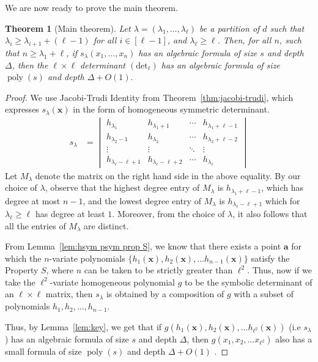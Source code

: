 \documentclass[10pt,a4paper]{article}
\newtheorem{theorem}{Theorem}
\theoremstyle{definition}
\newcommand{\va}{\mathbf a}
\newcommand{\vx}{\mathbf x}
\DeclareMathOperator{\poly}{poly}
\begin{document}
%
%
%


%
%
%
%

We are now ready to prove the main theorem. 

\begin{theorem}[Main theorem]
\label{thm:main-intro proof}
Let $\lambda= (\lambda_1,\ldots,\lambda_\ell)$ be a partition of $d$ such that  $\lambda_i \geq  \lambda_{i+1}+(\ell-1)$ for all $i \in [\ell-1]$, and $\lambda_{\ell} \geq \ell$. Then, for all $n$, such that $n \geq \lambda_1 + \ell$, if $s_\lambda(x_1,\ldots,x_n)$ has an algebraic formula of size $s$ and depth $\Delta$, then the $\ell\times \ell$ determinant $(\mathrm{det}_\ell )$ has an algebraic formula of size $\poly(s)$ and depth $\Delta + O(1).$  
\end{theorem}

\begin{proof}
	We use Jacobi-Trudi Identity from Theorem~\ref{thm:jacobi-trudi}, which expresses $s_\lambda(\vx)$ in the form of homogeneous symmetric determinant. 
\begin{align*}
s_\lambda &=  \begin{vmatrix}h_{\lambda_1}&h_{\lambda_1+1}&\cdots&h_{\lambda_1+\ell-1}\\h_{\lambda_2-1}&h_{\lambda_2}&\cdots&h_{\lambda_2+\ell-2}\\\vdots&\vdots&\ddots&\vdots\\h_{\lambda_\ell-\ell+1}&h_{\lambda_\ell-\ell+2}&\cdots&h_{\lambda_\ell}\end{vmatrix}
\end{align*}	
Let $M_{\lambda}$ denote the matrix on the right hand side in the above equality. By our choice of $\lambda$, observe that the highest degree entry of $M_{\lambda}$ is $h_{\lambda_1 + \ell -1}$, which has degree at most $n-1$, and the lowest degree entry of $M_{\lambda}$ is $h_{\lambda_{\ell}-\ell + 1}$ which for $\lambda_{\ell} \geq \ell$ has degree at least $1$. Moreover, from the choice of $\lambda$, it also follows that all the entries of $M_{\lambda}$ are distinct.
%
%

From Lemma~\ref{lem:hsym psym prop S}, we know that there exists a point $\va$ for which the $n$-variate polynomials $\{h_1({\vx}),h_2(\vx), \ldots h_{n-1}(\vx)\} $ satisfy the Property $S$, where $n$ can be taken to be strictly greater than $\ell^2$. Thus, now if we take the $\ell^2$-variate homogeneous polynomial $g$ to be the symbolic determinant of an $\ell \times \ell$ matrix, then $s_{\lambda}$ is obtained by a composition of $g$ with a subset of polynomials $h_1, h_2, \ldots, h_{n-1}$. 
%
%
 
Thus, by Lemma~\ref{lem:key}, we get that if $g(h_1({\vx}),h_2(\vx), \ldots h_{\ell^2}(\vx))$ (i.e $s_\lambda$) has an algebraic formula of size $s$ and depth $\Delta$, then $g(x_1,x_2, \ldots x_{\ell^2})$ also has a small formula of size $\poly(s)$ and depth $\Delta+O(1)$ . 
%
\end{proof} 
%
%
\end{document}
